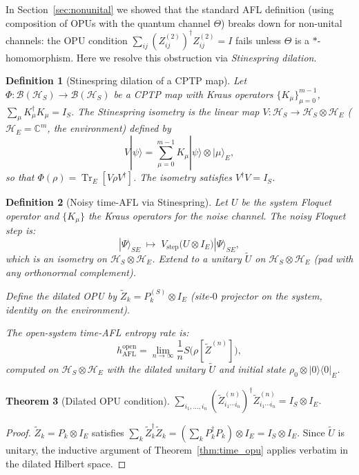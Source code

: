 \documentclass[12pt,a4paper]{article}
\newtheorem{theorem}{Theorem}[section]
\newtheorem{definition}[theorem]{Definition}
\begin{document}
In Section~\ref{sec:nonunital} we showed that the standard AFL definition
(using composition of OPUs with the quantum channel $\Theta$) breaks down
for non-unital channels: the OPU condition $\sum_{ij}(Z^{(2)}_{ij})^{\dagger}
Z^{(2)}_{ij}=I$ fails unless $\Theta$ is a $*$-homomorphism.
Here we resolve this obstruction via \emph{Stinespring dilation}.

\begin{definition}[Stinespring dilation of a CPTP map]
Let $\Phi:\mathcal{B}(\mathcal{H}_S)\to\mathcal{B}(\mathcal{H}_S)$ be a
CPTP map with Kraus operators $\{K_{\mu}\}_{\mu=0}^{m-1}$,
$\sum_{\mu}K_{\mu}^{\dagger}K_{\mu}=I_S$.  The
\emph{Stinespring isometry} is the linear map
$V:\mathcal{H}_S\to\mathcal{H}_S\otimes\mathcal{H}_E$
($\mathcal{H}_E=\mathbb{C}^m$, the environment) defined by
\[
  V|\psi\rangle = \sum_{\mu=0}^{m-1}K_{\mu}|\psi\rangle\otimes|\mu\rangle_E,
\]
so that $\Phi(\rho)=\operatorname{Tr}_E[V\rho V^{\dagger}]$.
The isometry satisfies $V^{\dagger}V=I_S$.
\end{definition}

\begin{definition}[Noisy time-AFL via Stinespring]
Let $U$ be the system Floquet operator and $\{K_{\mu}\}$ the Kraus operators
for the noise channel.  The \emph{noisy Floquet step} is:
\[
  |\Psi\rangle_{SE}\;\mapsto\; V_{\mathrm{step}}\bigl(U\otimes I_E\bigr)|\Psi\rangle_{SE},
\]
which is an isometry on $\mathcal{H}_S\otimes\mathcal{H}_E$.  Extend to
a unitary $\widetilde{U}$ on $\mathcal{H}_S\otimes\mathcal{H}_E$
(pad with any orthonormal complement).

Define the \emph{dilated OPU} by $\widetilde{Z}_k = P_k^{(S)}\otimes I_E$
(site-$0$ projector on the system, identity on the environment).

The \emph{open-system time-AFL entropy rate} is:
\[
  h_{\mathrm{AFL}}^{\mathrm{open}}
  = \lim_{n\to\infty}\frac{1}{n}
    S\!\bigl(\rho[\widetilde{Z}^{(n)}]\bigr),
\]
computed on $\mathcal{H}_S\otimes\mathcal{H}_E$ with the dilated unitary
$\widetilde{U}$ and initial state $\rho_0\otimes|0\rangle\langle 0|_E$.
\end{definition}

\begin{theorem}[Dilated OPU condition]
\label{thm:dilated_opu}
$\displaystyle\sum_{i_1,\ldots,i_n}
(\widetilde{Z}^{(n)}_{i_1\cdots i_n})^{\dagger}\widetilde{Z}^{(n)}_{i_1\cdots i_n}
= I_S\otimes I_E$.
\end{theorem}
\begin{proof}
$\widetilde{Z}_k=P_k\otimes I_E$ satisfies $\sum_k\widetilde{Z}_k^{\dagger}
\widetilde{Z}_k = (\sum_k P_k^{\dagger}P_k)\otimes I_E = I_S\otimes I_E$.
Since $\widetilde{U}$ is unitary, the inductive argument of
Theorem~\ref{thm:time_opu} applies verbatim in the dilated Hilbert space.
\end{proof}
\end{document}
